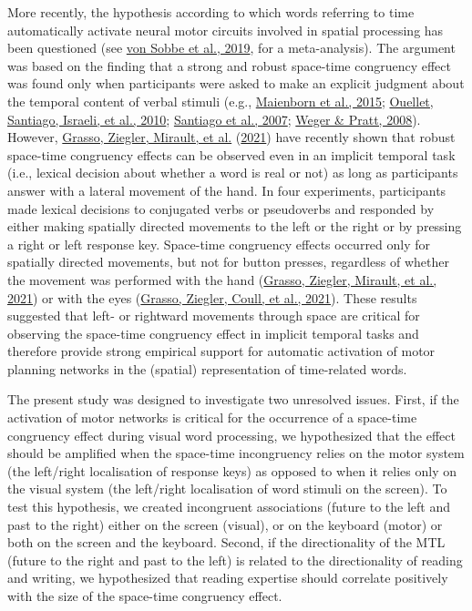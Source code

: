 \documentclass[
  a4paper,12pt,twoside,onecolumn,openright,final,oldfontcommands]{memoir}
\begin{document}
More recently, the hypothesis according to which words referring to time automatically activate neural motor circuits involved in spatial processing has been questioned (see \protect\hyperlink{ref-von_sobbe_space-time_2019}{von Sobbe et al., 2019}, for a meta-analysis). The argument was based on the finding that a strong and robust space-time congruency effect was found only when participants were asked to make an explicit judgment about the temporal content of verbal stimuli (e.g., \protect\hyperlink{ref-maienborn_we_2015}{Maienborn et al., 2015}; \protect\hyperlink{ref-ouellet_is_2010}{Ouellet, Santiago, Israeli, et al., 2010}; \protect\hyperlink{ref-santiago_time_2007}{Santiago et al., 2007}; \protect\hyperlink{ref-weger_time_2008}{Weger \& Pratt, 2008}). However, \protect\hyperlink{ref-grasso_as_2021}{Grasso, Ziegler, Mirault, et al.} (\protect\hyperlink{ref-grasso_as_2021}{2021}) have recently shown that robust space-time congruency effects can be observed even in an implicit temporal task (i.e., lexical decision about whether a word is real or not) as long as participants answer with a lateral movement of the hand. In four experiments, participants made lexical decisions to conjugated verbs or pseudoverbs and responded by either making spatially directed movements to the left or the right or by pressing a right or left response key. Space-time congruency effects occurred only for spatially directed movements, but not for button presses, regardless of whether the movement was performed with the hand (\protect\hyperlink{ref-grasso_as_2021}{Grasso, Ziegler, Mirault, et al., 2021}) or with the eyes (\protect\hyperlink{ref-grasso_eye_2021}{Grasso, Ziegler, Coull, et al., 2021}). These results suggested that left- or rightward movements through space are critical for observing the space-time congruency effect in implicit temporal tasks and therefore provide strong empirical support for automatic activation of motor planning networks in the (spatial) representation of time-related words.

The present study was designed to investigate two unresolved issues. First, if the activation of motor networks is critical for the occurrence of a space-time congruency effect during visual word processing, we hypothesized that the effect should be amplified when the space-time incongruency relies on the motor system (the left/right localisation of response keys) as opposed to when it relies only on the visual system (the left/right localisation of word stimuli on the screen). To test this hypothesis, we created incongruent associations (future to the left and past to the right) either on the screen (visual), or on the keyboard (motor) or both on the screen and the keyboard. Second, if the directionality of the MTL (future to the right and past to the left) is related to the directionality of reading and writing, we hypothesized that reading expertise should correlate positively with the size of the space-time congruency effect.
\end{document}
